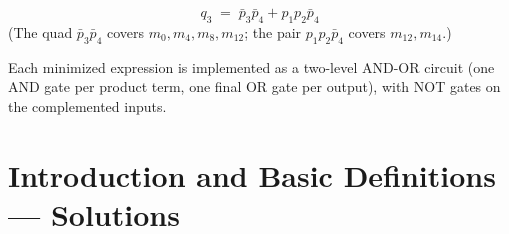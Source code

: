 \documentclass[11pt]{book}
\begin{document}
\begin{enumerate}[{0.}1. ]
\[
q_3 \;=\; \bar p_3\bar p_4 + p_1 p_2\bar p_4
\]
(The quad $\bar p_3\bar p_4$ covers $m_0,m_4,m_8,m_{12}$; the pair $p_1p_2\bar p_4$ covers $m_{12},m_{14}$.)

Each minimized expression is implemented as a two-level AND-OR circuit (one AND gate per product term, one final OR gate per output), with NOT gates on the complemented inputs.

\end{enumerate}

\chapter{Introduction and Basic Definitions --- Solutions}
\end{document}
